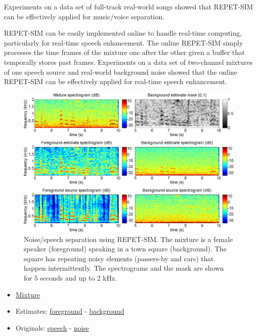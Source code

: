 \documentclass{article}
\begin{document}
Experiments on a data set of full-track real-world songs showed that REPET-SIM can be effectively applied for music/voice separation.

REPET-SIM can be easily implemented online to handle real-time computing, particularly for real-time speech enhancement. The online REPET-SIM simply processes the time frames of the mixture one after the other given a buffer that temporally stores past frames. Experiments on a data set of two-channel mixtures of one speech source and real-world background noise showed that the online REPET-SIM can be effectively applied for real-time speech enhancement.

\begin{figure}[!htb]
\centering
\includegraphics[width=\columnwidth]{Images/repet_sim_example.png}
\caption{Noise/speech separation using REPET-SIM. The mixture is a female speaker (foreground) speaking in a town square (background). The square has repeating noisy elements (passers-by and cars) that happen intermittently. The spectrograms and the mask are shown for 5 seconds and up to 2 kHz.}
\label{fig:repet_sim_example}
\end{figure}

\begin{itemize}[noitemsep,topsep=0pt]
\item \href{Audio/REPET/dev_Sq1_Co_B_mix.wav}{Mixture}
\item Estimates: \href{Audio/REPET/dev_Sq1_Co_B_mix_foreground.wav}{foreground} - \href{Audio/REPET/dev_Sq1_Co_B_mix_background.wav}{background}
\item Originals: \href{Audio/REPET/dev_Sq1_Co_B_sim.wav}{speech} - \href{Audio/REPET/dev_Sq1_Co_B_noi.wav}{noise}
\end{itemize}
\end{document}
